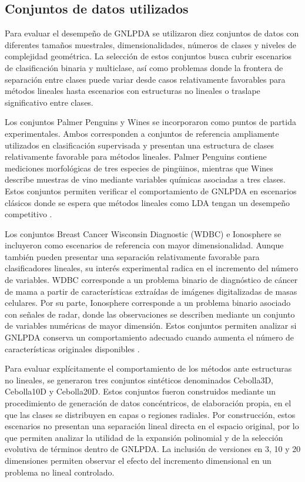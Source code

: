 \subsection{Conjuntos de datos utilizados}

Para evaluar el desempeño de GNLPDA se utilizaron diez conjuntos de datos con diferentes tamaños muestrales, dimensionalidades, números de clases y niveles de complejidad geométrica. La selección de estos conjuntos busca cubrir escenarios de clasificación binaria y multiclase, así como problemas donde la frontera de separación entre clases puede variar desde casos relativamente favorables para métodos lineales hasta escenarios con estructuras no lineales o traslape significativo entre clases.

Los conjuntos Palmer Penguins y Wines se incorporaron como puntos de partida
experimentales. Ambos corresponden a conjuntos de referencia ampliamente utilizados en clasificación supervisada y presentan una estructura de clases relativamente favorable para métodos lineales. Palmer Penguins contiene mediciones morfológicas de tres especies de pingüinos, mientras que Wines describe muestras de vino mediante variables químicas asociadas a tres clases. Estos conjuntos permiten verificar el comportamiento de GNLPDA en escenarios clásicos donde se espera que métodos lineales como LDA tengan un desempeño competitivo \cite{horst2022palmer}\cite{barth2021classification}.

Los conjuntos Breast Cancer Wisconsin Diagnostic (WDBC) e Ionosphere se incluyeron como escenarios de referencia con mayor dimensionalidad. Aunque también pueden presentar una separación relativamente favorable para clasificadores lineales, su interés experimental radica en el incremento del número de variables. WDBC corresponde a un problema binario de diagnóstico de cáncer de mama a partir de características extraídas de imágenes digitalizadas de masas celulares. Por su parte, Ionosphere corresponde a un problema binario asociado con señales de radar, donde las observaciones se describen mediante un conjunto de variables numéricas de mayor dimensión. Estos conjuntos permiten analizar si GNLPDA conserva un comportamiento adecuado cuando aumenta el número de características originales disponibles \cite{salama2012breast} \cite{sigillito1989classification}.

Para evaluar explícitamente el comportamiento de los métodos ante estructuras no lineales, se generaron tres conjuntos sintéticos denominados Cebolla3D, Cebolla10D y Cebolla20D. Estos conjuntos fueron construidos mediante un procedimiento de generación de datos concéntricos, de elaboración propia, en el que las clases se distribuyen en capas o regiones radiales. Por construcción, estos escenarios no presentan una separación lineal directa en el espacio original, por lo que permiten analizar la utilidad de la expansión polinomial y de la selección evolutiva de términos dentro de GNLPDA. La inclusión de versiones en 3, 10 y 20 dimensiones permiten observar el efecto del incremento dimensional en un problema no
lineal controlado.

